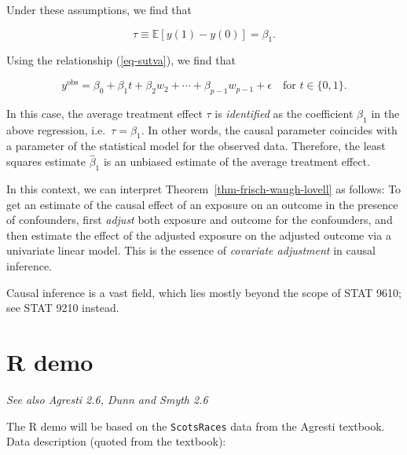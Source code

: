 \documentclass[
  11pt,
  letterpaper,
  oneside]{book}
\theoremstyle{plain}
\theoremstyle{plain}
\theoremstyle{definition}
\theoremstyle{definition}
\theoremstyle{plain}
\theoremstyle{remark}
\begin{document}
Under these assumptions, we find that

\[
\tau \equiv \mathbb{E}[y(1) - y(0)] = \beta_1.
\]

Using the relationship (\ref{eq-sutva}), we find that

\[
y^{\text{obs}} = \beta_0 + \beta_1 t + \beta_2 w_2 + \cdots + \beta_{p-1} w_{p-1} + \epsilon \quad \text{for } t \in \{0, 1\}.
\]

In this case, the average treatment effect \(\tau\) is \emph{identified}
as the coefficient \(\beta_1\) in the above regression,
i.e.~\(\tau = \beta_1\). In other words, the causal parameter coincides
with a parameter of the statistical model for the observed data.
Therefore, the least squares estimate \(\widehat{\beta}_1\) is an
unbiased estimate of the average treatment effect.

In this context, we can interpret Theorem~\ref{thm-frisch-waugh-lovell}
as follows: To get an estimate of the causal effect of an exposure on an
outcome in the presence of confounders, first \emph{adjust} both
exposure and outcome for the confounders, and then estimate the effect
of the adjusted exposure on the adjusted outcome via a univariate linear
model. This is the essence of \emph{covariate adjustment} in causal
inference.

\begin{tcolorbox}[enhanced jigsaw, coltitle=black, colbacktitle=quarto-callout-note-color!10!white, colframe=quarto-callout-note-color-frame, left=2mm, title=\textcolor{quarto-callout-note-color}{\faInfo}\hspace{0.5em}{Note}, colback=white, leftrule=.75mm, opacitybacktitle=0.6, rightrule=.15mm, breakable, bottomtitle=1mm, arc=.35mm, titlerule=0mm, bottomrule=.15mm, toptitle=1mm, toprule=.15mm, opacityback=0]

Causal inference is a vast field, which lies mostly beyond the scope of
STAT 9610; see STAT 9210 instead.

\end{tcolorbox}

\hypertarget{sec-r-demo-part-1}{%
\chapter{R demo}\label{sec-r-demo-part-1}}

\emph{See also Agresti 2.6, Dunn and Smyth 2.6}

The R demo will be based on the \texttt{ScotsRaces} data from the
Agresti textbook. Data description (quoted from the textbook):
\end{document}
